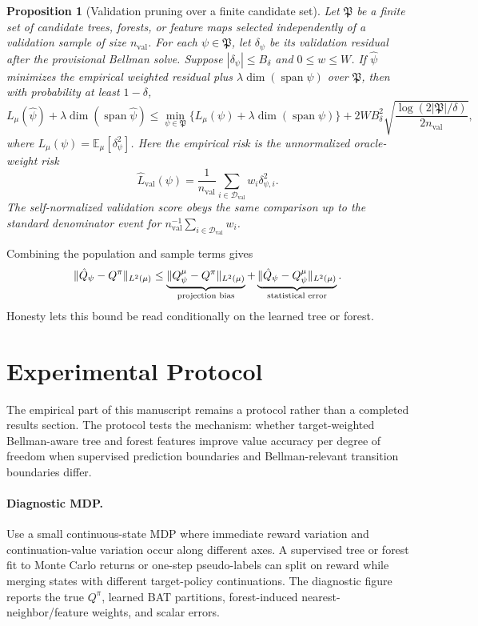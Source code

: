 \documentclass{article}
\DeclareMathOperator{\spann}{span}
\newcommand{\E}{\mathbb{E}}
\newcommand{\cD}{\mathcal D}
\theoremstyle{plain}
\newtheorem{proposition}{Proposition}
\theoremstyle{definition}
\theoremstyle{remark}
\begin{document}
\begin{proposition}[Validation pruning over a finite candidate set]
\label{prop:validation}
Let \(\mathfrak P\) be a finite set of candidate trees, forests, or feature
maps selected independently of a validation sample of size \(n_{\mathrm{val}}\).
For each \(\psi\in\mathfrak P\), let \(\delta_\psi\) be its validation
residual after the provisional Bellman solve. Suppose
\(|\delta_\psi|\le B_\delta\) and \(0\le w\le W\). If
\(\hat\psi\) minimizes the empirical weighted residual plus
\(\lambda\dim(\spann\psi)\) over \(\mathfrak P\), then with probability at
least \(1-\delta\),
\[
  L_\mu(\hat\psi)+\lambda\dim(\spann\hat\psi)
  \le
  \min_{\psi\in\mathfrak P}
  \{L_\mu(\psi)+\lambda\dim(\spann\psi)\}
  +
  2WB_\delta^2
  \sqrt{\frac{\log(2|\mathfrak P|/\delta)}{2n_{\mathrm{val}}}},
\]
where \(L_\mu(\psi)=\E_\mu[\delta_\psi^2]\).
Here the empirical risk is the unnormalized oracle-weight risk
\[
  \widehat L_{\mathrm{val}}(\psi)
  =
  \frac{1}{n_{\mathrm{val}}}
  \sum_{i\in\cD_{\mathrm{val}}}w_i\delta_{\psi,i}^2 .
\]
The self-normalized validation score obeys the same comparison up to the
standard denominator event for
\(n_{\mathrm{val}}^{-1}\sum_{i\in\cD_{\mathrm{val}}}w_i\).
\end{proposition}

Combining the population and sample terms gives
\[
  \|\hat Q_\psi-Q^\pi\|_{L^2(\mu)}
  \le
  \underbrace{\|Q^\mu_\psi-Q^\pi\|_{L^2(\mu)}}_{\textnormal{projection bias}}
  +
  \underbrace{\|\hat Q_\psi-Q^\mu_\psi\|_{L^2(\mu)}}_{\textnormal{statistical error}}.
\]
Honesty lets this bound be read conditionally on the learned tree or forest.

\section{Experimental Protocol}
\label{sec:experiments}

The empirical part of this manuscript remains a protocol rather than a
completed results section. The protocol tests the mechanism: whether
target-weighted Bellman-aware tree and forest features improve value accuracy
per degree of freedom when supervised prediction boundaries and Bellman-relevant
transition boundaries differ.

\paragraph{Diagnostic MDP.}
Use a small continuous-state MDP where immediate reward variation and
continuation-value variation occur along different axes. A supervised tree or
forest fit to Monte Carlo returns or one-step pseudo-labels can split on reward
while merging states with different target-policy continuations. The diagnostic
figure reports the true \(Q^\pi\), learned BAT partitions, forest-induced
nearest-neighbor/feature weights, and scalar errors.
\end{document}
